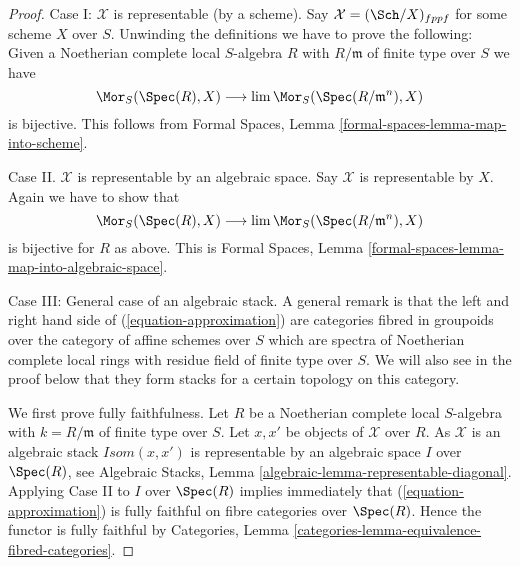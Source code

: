 \begin{proof}
Case I: $\mathcal{X}$ is representable (by a scheme). Say
$\mathcal{X} = (\Sch/X)_{fppf}$ for some scheme $X$ over $S$.
Unwinding the definitions we have to prove the following: Given
a Noetherian complete local $S$-algebra $R$ with $R/\mathfrak m$ of
finite type over $S$ we have
$$
\Mor_S(\Spec(R), X) \longrightarrow \lim \Mor_S(\Spec(R/\mathfrak m^n), X)
$$
is bijective. This follows from Formal Spaces, Lemma
\ref{formal-spaces-lemma-map-into-scheme}.

\medskip\noindent
Case II. $\mathcal{X}$ is representable by an algebraic space. Say
$\mathcal{X}$ is representable by $X$. Again we have to show that
$$
\Mor_S(\Spec(R), X) \longrightarrow \lim \Mor_S(\Spec(R/\mathfrak m^n), X)
$$
is bijective for $R$ as above. This is Formal Spaces, Lemma
\ref{formal-spaces-lemma-map-into-algebraic-space}.

\medskip\noindent
Case III: General case of an algebraic stack. A general remark is that
the left and right hand side of (\ref{equation-approximation}) are
categories fibred in groupoids over the category of affine schemes
over $S$ which are spectra of Noetherian complete local rings
with residue field of finite type over $S$. We will also see in the
proof below that they form stacks for a certain topology on this
category.

\medskip\noindent
We first prove fully faithfulness. Let $R$ be a Noetherian complete
local $S$-algebra with $k = R/\mathfrak m$ of finite type over $S$.
Let $x, x'$ be objects of $\mathcal{X}$ over $R$. As $\mathcal{X}$ is
an algebraic stack $\mathit{Isom}(x, x')$ is representable by an
algebraic space $I$ over $\Spec(R)$, see
Algebraic Stacks, Lemma \ref{algebraic-lemma-representable-diagonal}.
Applying Case II to $I$ over $\Spec(R)$ implies immediately that
(\ref{equation-approximation}) is fully faithful on fibre categories over
$\Spec(R)$. Hence the functor is fully faithful by
Categories, Lemma \ref{categories-lemma-equivalence-fibred-categories}.


\end{proof}
